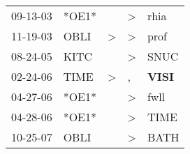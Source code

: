 \begin{supertabular}{p{0.07\textwidth}p{0.06\textwidth}p{0.02\textwidth}p{0.02\textwidth}p{0.06\textwidth}}
 09-13-03\textsuperscript{} &                   *OE1* &               &  \textgreater &           rhia\textsuperscript{} \\
 11-19-03\textsuperscript{} &  OBLI\textsuperscript{} &  \textgreater &  \textgreater &           prof\textsuperscript{} \\
 08-24-05\textsuperscript{} &  KITC\textsuperscript{} &               &  \textgreater &           SNUC\textsuperscript{} \\
 02-24-06\textsuperscript{} &  TIME\textsuperscript{} &  \textgreater &             , &  \textbf{VISI\textsuperscript{}} \\
 04-27-06\textsuperscript{} &                   *OE1* &               &  \textgreater &           fwll\textsuperscript{} \\
 04-28-06\textsuperscript{} &                   *OE1* &               &  \textgreater &           TIME\textsuperscript{} \\
 10-25-07\textsuperscript{} &  OBLI\textsuperscript{} &               &  \textgreater &           BATH\textsuperscript{} \\
\end{supertabular}
